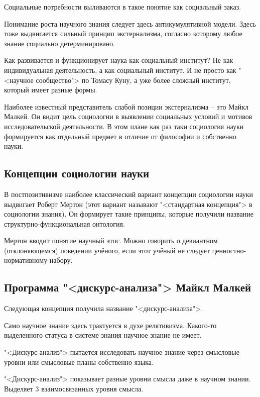 \documentclass[main.tex]{subfiles}
\begin{document}
Социальные потребности выливаются в такое понятие как социальный заказ.

Понимание роста научного знания следует здесь антикумулятивной модели.
Здесь тоже выдвигается сильный принцип экстернализма, согласно которому любое знание социально детерминировано.

Как развивается и функционирует наука как социальный институт?
Не как индивидуальная деятельность, а как социальный институт.
И не просто как "<научное сообщество"> по Томасу Куну, а уже более сложный институт, который имеет разные формы.

Наиболее известный представитель слабой позиции экстернализма -- это Майкл Малкей.
Он видит цель социологии в выявлении социальных условий и мотивов исследовательской деятельности.
В этом плане как раз таки социология науки формируется как отдельный предмет в отличие от философии и собственно науки.

\subsection{Концепции социологии науки}


В постпозитивизме наиболее классический вариант концепции социологии науки выдвигает Роберт Мертон (этот вариант называют "<стандартная концепция"> в социологии знания).
Он формирует такие принципы, которые получили название структурно-функциональная онтология.

Мертон вводит понятие научный этос.
Можно говорить о девиантном (отклоняющемся) поведении учёного, если этот учёный не следует ценностно-нормативному набору. 

\subsection{Программа "<дискурс-анализа"> Майкл Малкей}


Следующая концепция получила название "<дискурс-анализа">.

Само научное знание здесь трактуется в духе релятивизма.
Какого-то выделенного статуса в системе знания научное знание не имеет.

"<Дискурс-анализ"> пытается исследовать научное знание через смысловые уровни или смысловые планы собственно языка.

"<Дискурс-анализ"> показывает разные уровни смысла даже в научном знании.
Выделяет 3 взаимосвязанных уровня смысла.
\end{document}
